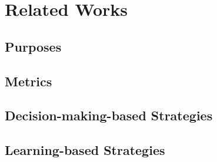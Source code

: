 \chapter{Related Works}
\section{Purposes}
\section{Metrics}
\section{Decision-making-based Strategies}
\section{Learning-based Strategies}